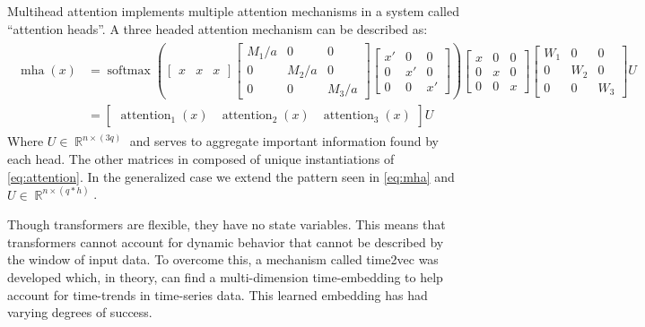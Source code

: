 \documentclass{article}
\DeclareMathOperator{\R}{\mathbb{R}}
\DeclareMathOperator{\softmax}{\text{softmax}}
\DeclareMathOperator{\attention}{\text{attention}}
\DeclareMathOperator{\mha}{\text{mha}}
\numberwithin{equation}{subsection}
\begin{document}
Multihead attention implements multiple attention mechanisms in a system called ``attention heads''. A three headed
attention mechanism can be described as:
\begin{align}
  \begin{split}
      \mha(x)
        & =  \softmax\left( \begin{bmatrix}
            x & x & x 
          \end{bmatrix} \begin{bmatrix}
            M_1/a & 0   &  0 \\
            0   & M_2/a &  0 \\
            0   & 0   & M_3/a
          \end{bmatrix} \begin{bmatrix}
            x' & 0 & 0 \\
            0  & x'& 0 \\
            0  & 0 & x'
          \end{bmatrix}
          \right) \begin{bmatrix}
            x & 0 & 0 \\
            0 & x & 0 \\
            0 & 0 & x
          \end{bmatrix} \begin{bmatrix}
            W_1 & 0   & 0 \\
            0   & W_2 & 0 \\
            0   & 0   & W_3
          \end{bmatrix}
          U \\[5pt]
        & = \begin{bmatrix}
          \attention_1(x) & \attention_2(x) & \attention_3(x)
        \end{bmatrix}U \label{eq:mha}
  \end{split}
\end{align}
  Where $U \in \R^{n\times (3q)}$ and serves to aggregate important information found by each head.
The other matrices in  composed of unique instantiations of \ref{eq:attention}. In the generalized
case we extend the pattern seen in \ref{eq:mha} and $U \in \R^{n\times (q*h)}$.

Though transformers are flexible, they have no state variables. This means that transformers cannot
account for dynamic behavior that cannot be described by the window of input data. To overcome this,
a mechanism called time2vec was developed which, in theory, can find a multi-dimension time-embedding
to help account for time-trends in time-series data. This learned embedding has had varying degrees
of success.
\end{document}
